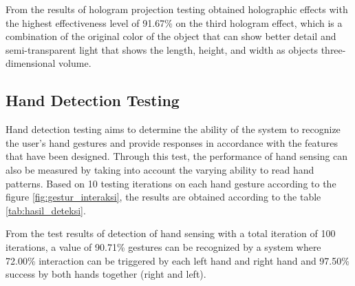 \documentclass[conference]{IEEEtran}
\begin{document}
		From the results of hologram projection testing obtained holographic effects with the highest effectiveness level of 91.67\% on the third hologram effect, which is a combination of the original color of the object that can show better detail and semi-transparent light that shows the length, height, and width as objects three-dimensional volume.

	\subsection{Hand Detection Testing} 
		Hand detection testing aims to determine the ability of the system to recognize the user's hand gestures and provide responses in accordance with the features that have been designed. Through this test, the performance of hand sensing can also be measured by taking into account the varying ability to read hand patterns. Based on 10 testing iterations on each hand gesture according to the figure \ref{fig:gestur_interaksi}, the results are obtained according to the table \ref{tab:hasil_deteksi}.

		From the test results of detection of hand sensing with a total iteration of 100 iterations, a value of 90.71\% gestures can be recognized by a system where 72.00\% interaction can be triggered by each left hand and right hand and 97.50\% success by both hands together (right and left).
		
\end{document}
